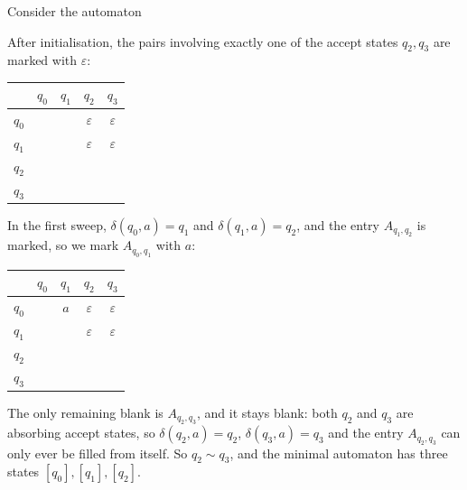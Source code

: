 \documentclass[a4paper]{scrartcl}
\newcommand{\eps}{\varepsilon}
\newcommand{\initarr}[2]{\draw[tra] ($(#1)+#2$) -- (#1);}
\begin{document}
\begin{example}
	Consider the automaton
	\begin{center}
	\end{center}
	After initialisation, the pairs involving exactly one of the accept states $q_2, q_3$ are marked with $\eps$:
	\begin{center}
	\begin{tabular}{c|cccc}
		& $q_0$ & $q_1$ & $q_2$ & $q_3$ \\\hline
		$q_0$ & & & $\eps$ & $\eps$ \\
		$q_1$ & & & $\eps$ & $\eps$ \\
		$q_2$ & & & & \\
		$q_3$ & & & &
	\end{tabular}
	\end{center}
	In the first sweep, $\delta(q_0,a) = q_1$ and $\delta(q_1,a) = q_2$, and the entry $A_{q_1,q_2}$ is marked, so we mark $A_{q_0,q_1}$ with $a$:
	\begin{center}
	\begin{tabular}{c|cccc}
		& $q_0$ & $q_1$ & $q_2$ & $q_3$ \\\hline
		$q_0$ & & $a$ & $\eps$ & $\eps$ \\
		$q_1$ & & & $\eps$ & $\eps$ \\
		$q_2$ & & & & \\
		$q_3$ & & & &
	\end{tabular}
	\end{center}
	The only remaining blank is $A_{q_2,q_3}$, and it stays blank: both $q_2$ and $q_3$ are absorbing accept states, so $\delta(q_2,a) = q_2$, $\delta(q_3,a) = q_3$ and the entry $A_{q_2,q_3}$ can only ever be filled from itself. So $q_2 \sim q_3$, and the minimal automaton has three states $[q_0], [q_1], [q_2]$.


\end{example}
\end{document}
